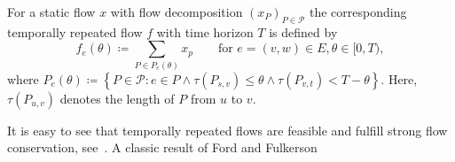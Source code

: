 \begin{definition}
For a static flow $x$ with flow decomposition $(x_P)_{P \in \mathcal{P}}$ the corresponding temporally repeated flow $f$ with time horizon $T$ is defined by
\[f_e(\theta) \coloneqq \sum_{P \in P_e(\theta)} x_p \qquad \text{for }e=(v,w) \in E, \theta \in [0,T),\]
where $P_e(\theta) \coloneqq \left\{P \in \mathcal{P} : e \in P \wedge \tau(P_{s,v}) \leq \theta \wedge \tau(P_{v,t}) < T-\theta \right\}$. Here, $\tau(P_{u,v})$ denotes the length of $P$ from $u$ to $v$.
\end{definition}

It is easy to see that temporally repeated flows are feasible and fulfill strong flow conservation, see~\cite{Skutella2009survey}.
A classic result of Ford and Fulkerson~\cite{ford1958constructing} 




